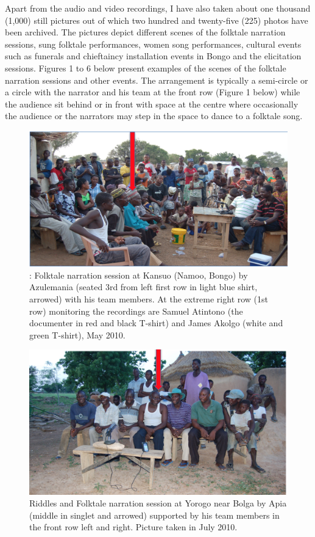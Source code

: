 \documentclass[output=paper,colorlinks,citecolor=brown]{langscibook}
\begin{document}
Apart from the audio and video recordings, I have also taken about one thousand (1,000) still pictures out of which two hundred and twenty-five (225) photos have been archived. The pictures depict different scenes of the folktale narration sessions, sung folktale performances, women song performances, cultural events such as funerals and chieftaincy installation events in Bongo and the elicitation sessions. Figures 1 to 6 below present examples of the scenes of the folktale narration sessions and other events. The arrangement is typically a semi-circle or a circle with the narrator and his team at the front row (Figure 1 below) while the audience sit behind or in front with space at the centre where occasionally the audience or the narrators may step in the space to dance to a folktale song.

\begin{figure}
\includegraphics[scale=0.55]{../figures/azulemania.png}
\caption{: Folktale narration session at Kansuo (Namoo, Bongo) by Azulemania (seated 3rd from left first row 
 	 in light blue shirt, arrowed) with his team members. At the extreme right row (1st row) monitoring 
 	the recordings are Samuel Atintono (the documenter in red and black T-shirt) and James Akolgo 
 	(white and green T-shirt), May 2010.}

\end{figure}

\begin{figure}
\includegraphics[scale=0.55]{../figures/apia.png}
\caption{Riddles and Folktale narration session at Yorogo near Bolga by Apia (middle in singlet and arrowed) supported by his team members in the front row left and right. Picture taken in July 2010.}

\end{figure}
\end{document}
